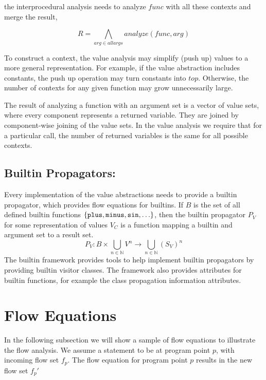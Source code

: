 the interprocedural analysis needs to analyze $func$ with all these contexts and merge the result,

\begin{equation*}
 R = \bigwedge_{arg \in allargs} analyze(func, arg)
\end{equation*}

To construct a context, the value analysis may simplify (push up)
values to a more general representation. For example, if the value
abstraction includes constants, the push up operation may turn
constants into $top$. Otherwise, the number of contexts for any given
function may grow unnecessarily large.

The result of analyzing a function with an argument set is a vector of
value sets, where every component represents a returned variable. They are joined by
component-wise joining of the value sets. In the value analysis we
require that for a particular call, the number of returned variables
is the same for all possible contexts.

\subsection{Builtin Propagators:}

Every implementation of the value abstractions needs to provide a
builtin propagator, which provides flow equations for builtins. If $B$
is the set of all defined builtin functions $\{ {\text{\tt plus}},
{\text{\tt minus}}, {\text{\tt sin}}, \ldots \}$, then the builtin
propagator $P_V$ for some representation of values $V_C$ is a function
 mapping a builtin and argument set to a result set.
\begin{equation*}
  P_V : B \times \bigcup_{n \in \mathbb{N}} V^n \rightarrow \bigcup_{n \in \mathbb{N}} (S_V)^n
\end{equation*}
The builtin framework provides tools to help implement builtin
propagators by providing builtin visitor classes. The framework also
provides attributes for builtin functions, for example the class
propagation information attributes.

\section{Flow Equations}

In the following subsection we will show a sample of flow equations to illustrate
the flow analysis. We assume a statement to be at program point
$p$, with incoming flow set $f_p$. The flow equation for program point $p$
results in the new flow set $f_p'$

